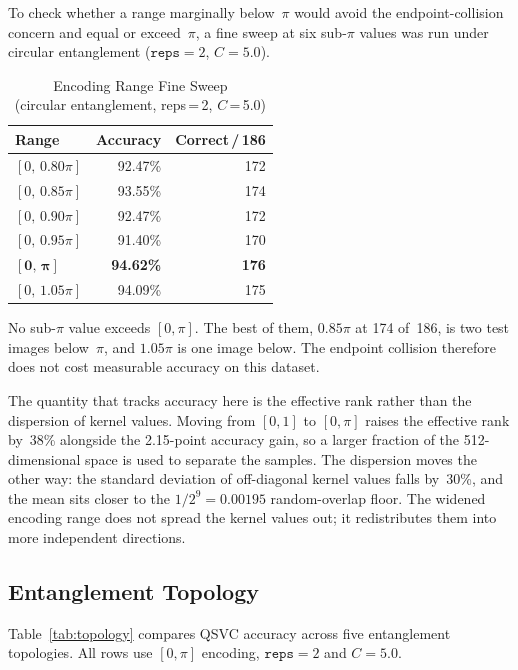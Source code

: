 \documentclass[10pt,conference]{IEEEtran}
\begin{document}
To check whether a range marginally below~$\pi$ would avoid the
endpoint-collision concern and equal or exceed~$\pi$, a fine sweep at
six sub-$\pi$ values was run under circular entanglement
($\texttt{reps}\!=\!2$, $C\!=\!5.0$).

\begin{table}[t]
\caption{Encoding Range Fine Sweep\\
         (circular entanglement, reps\,=\,2, $C$\,=\,5.0)}
\label{tab:finesweep}
\centering
\renewcommand{\arraystretch}{1.1}
\begin{tabular}{lrr}
\toprule
Range & Accuracy & Correct\,/\,186\\
\midrule
$[0,\,0.80\pi]$ & 92.47\% & 172\\
$[0,\,0.85\pi]$ & 93.55\% & 174\\
$[0,\,0.90\pi]$ & 92.47\% & 172\\
$[0,\,0.95\pi]$ & 91.40\% & 170\\
$\mathbf{[0,\,\pi]}$ & \textbf{94.62\%} & \textbf{176}\\
$[0,\,1.05\pi]$ & 94.09\% & 175\\
\bottomrule
\end{tabular}
\end{table}

No sub-$\pi$ value exceeds $[0,\pi]$. The best of them, $0.85\pi$ at
174 of~186, is two test images below~$\pi$, and $1.05\pi$ is one image
below. The endpoint collision therefore does not cost measurable
accuracy on this dataset.

The quantity that tracks accuracy here is the effective rank rather than
the dispersion of kernel values. Moving from $[0,1]$ to $[0,\pi]$
raises the effective rank by~38\% alongside the 2.15-point accuracy
gain, so a larger fraction of the 512-dimensional space is used to
separate the samples. The dispersion moves the other way: the standard
deviation of off-diagonal kernel values falls by~30\%, and the mean
sits closer to the $1/2^9\!=\!0.00195$ random-overlap floor. The
widened encoding range does not spread the kernel values out; it
redistributes them into more independent directions.

\subsection{Entanglement Topology}

Table~\ref{tab:topology} compares QSVC accuracy across five entanglement
topologies. All rows use $[0,\pi]$ encoding, $\texttt{reps}\!=\!2$ and
$C\!=\!5.0$.
\end{document}
